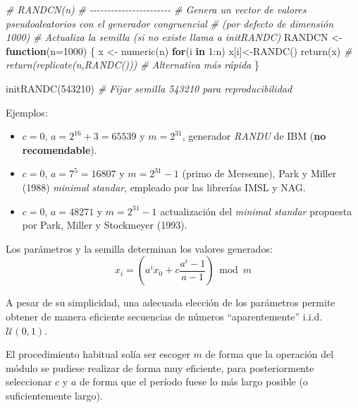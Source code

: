 \documentclass[
]{book}
\newenvironment{Shaded}{\begin{snugshade}}{\end{snugshade}}
\newcommand{\AttributeTok}[1]{\textcolor[rgb]{0.77,0.63,0.00}{#1}}
\newcommand{\CommentTok}[1]{\textcolor[rgb]{0.56,0.35,0.01}{\textit{#1}}}
\newcommand{\ControlFlowTok}[1]{\textcolor[rgb]{0.13,0.29,0.53}{\textbf{#1}}}
\newcommand{\DecValTok}[1]{\textcolor[rgb]{0.00,0.00,0.81}{#1}}
\newcommand{\FunctionTok}[1]{\textcolor[rgb]{0.00,0.00,0.00}{#1}}
\newcommand{\NormalTok}[1]{#1}
\newcommand{\OtherTok}[1]{\textcolor[rgb]{0.56,0.35,0.01}{#1}}
\newcommand{\SpecialCharTok}[1]{\textcolor[rgb]{0.00,0.00,0.00}{#1}}
\theoremstyle{break}
\theoremstyle{definition}
\theoremstyle{definition}
\theoremstyle{definition}
\theoremstyle{definition}
\theoremstyle{remark}
\begin{document}
\begin{Shaded}
\begin{Highlighting}[]
\CommentTok{\# RANDCN(n)}
\CommentTok{\# {-}{-}{-}{-}{-}{-}{-}{-}{-}{-}{-}{-}{-}{-}{-}{-}{-}{-}{-}{-}{-}{-}{-}}
\CommentTok{\#   Genera un vector de valores pseudoaleatorios con el generador congruencial}
\CommentTok{\#   (por defecto de dimensión 1000)}
\CommentTok{\#   Actualiza la semilla (si no existe llama a initRANDC)}
\NormalTok{RANDCN }\OtherTok{\textless{}{-}} \ControlFlowTok{function}\NormalTok{(}\AttributeTok{n=}\DecValTok{1000}\NormalTok{) \{}
\NormalTok{    x }\OtherTok{\textless{}{-}} \FunctionTok{numeric}\NormalTok{(n)}
    \ControlFlowTok{for}\NormalTok{(i }\ControlFlowTok{in} \DecValTok{1}\SpecialCharTok{:}\NormalTok{n) x[i]}\OtherTok{\textless{}{-}}\FunctionTok{RANDC}\NormalTok{()}
    \FunctionTok{return}\NormalTok{(x)}
    \CommentTok{\# return(replicate(n,RANDC()))  \# Alternativa más rápida    }
\NormalTok{\}}

\FunctionTok{initRANDC}\NormalTok{(}\DecValTok{543210}\NormalTok{)       }\CommentTok{\# Fijar semilla 543210 para reproducibilidad}
\end{Highlighting}
\end{Shaded}

Ejemplos:

\begin{itemize}
\item
  \(c=0\), \(a=2^{16}+3=65539\) y \(m=2^{31}\), generador \emph{RANDU} de IBM
  (\textbf{no recomendable}).
\item
  \(c=0\), \(a=7^{5}=16807\) y \(m=2^{31}-1\) (primo de Mersenne), Park y Miller (1988)
  \emph{minimal standar}, empleado por las librerías IMSL y NAG.
\item
  \(c=0\), \(a=48271\) y \(m=2^{31}-1\) actualización del \emph{minimal standar}
  propuesta por Park, Miller y Stockmeyer (1993).
\end{itemize}

Los parámetros y la semilla determinan los valores generados:
\[x_{i}=\left(  a^{i}x_0+c\frac{a^{i}-1}{a-1}\right) \bmod m\]

A pesar de su simplicidad, una adecuada elección de los parámetros
permite obtener de manera eficiente secuencias de números
``aparentemente'' i.i.d. \(\mathcal{U}(0,1)\).

El procedimiento habitual solía ser escoger \(m\) de forma que la operación del módulo se pudiese realizar de forma muy eficiente, para posteriormente seleccionar \(c\) y \(a\) de forma que el período fuese lo más largo posible (o suficientemente largo).
\end{document}
